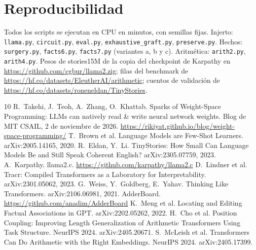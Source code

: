\documentclass[11pt]{article}
\begin{document}
\section*{Reproducibilidad}\sloppy
Todos los scripts se ejecutan en CPU en minutos, con semillas fijas. Injerto: \texttt{llama.py}, \texttt{circuit.py}, \texttt{eval.py}, \texttt{exhaustive\_graft.py}, \texttt{preserve.py}. Hechos: \texttt{surgery.py}, \texttt{facts6.py}, \texttt{facts7.py} (variantes a, b y c). Aritmética: \texttt{arith2.py}, \texttt{arith4.py}. Pesos de stories15M de la copia del checkpoint de Karpathy en \url{https://github.com/cgbur/llama2.zig}; filas del benchmark de \url{https://hf.co/datasets/EleutherAI/arithmetic}; cuentos de validación de \url{https://hf.co/datasets/roneneldan/TinyStories}.

\begin{thebibliography}{10}
 R.~Takehi, J.~Teoh, A.~Zhang, O.~Khattab. Sparks of Weight-Space Programming: LLMs can natively read \& write neural network weights. Blog de MIT CSAIL, 2 de noviembre de 2026. \url{https://rikiyat.github.io/blog/weight-space-programming/}
 T.~Brown et al. Language Models are Few-Shot Learners. arXiv:2005.14165, 2020.
 R.~Eldan, Y.~Li. TinyStories: How Small Can Language Models Be and Still Speak Coherent English? arXiv:2305.07759, 2023.
 A.~Karpathy. llama2.c. \url{https://github.com/karpathy/llama2.c}
 D.~Lindner et al. Tracr: Compiled Transformers as a Laboratory for Interpretability. arXiv:2301.05062, 2023.
 G.~Weiss, Y.~Goldberg, E.~Yahav. Thinking Like Transformers. arXiv:2106.06981, 2021.
 AdderBoard. \url{https://github.com/anadim/AdderBoard}
 K.~Meng et al. Locating and Editing Factual Associations in GPT. arXiv:2202.05262, 2022.
 H.~Cho et al. Position Coupling: Improving Length Generalization of Arithmetic Transformers Using Task Structure. NeurIPS 2024. arXiv:2405.20671.
 S.~McLeish et al. Transformers Can Do Arithmetic with the Right Embeddings. NeurIPS 2024. arXiv:2405.17399.
\end{thebibliography}
\end{document}
